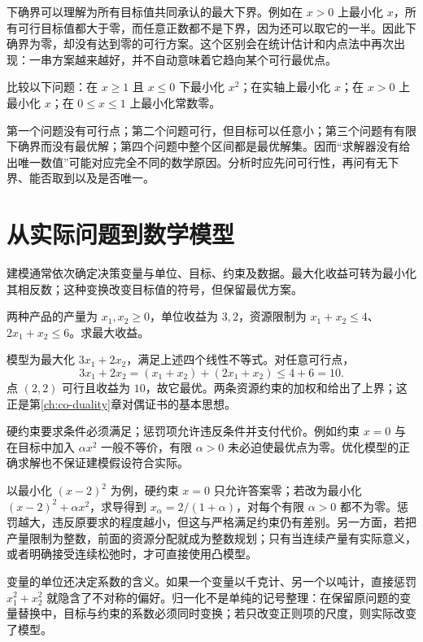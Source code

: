 下确界可以理解为所有目标值共同承认的最大下界。例如在 $x>0$ 上最小化 $x$，所有可行目标值都大于零，而任意正数都不是下界，因为还可以取它的一半。因此下确界为零，却没有达到零的可行方案。这个区别会在统计估计和内点法中再次出现：一串方案越来越好，并不自动意味着它趋向某个可行最优点。

\begin{example}[四种问题状态]
比较以下问题：在 $x\geq1$ 且 $x\leq0$ 下最小化 $x^2$；在实轴上最小化 $x$；在 $x>0$ 上最小化 $x$；在 $0\leq x\leq1$ 上最小化常数零。
\end{example}
\begin{solve}
第一个问题没有可行点；第二个问题可行，但目标可以任意小；第三个问题有有限下确界而没有最优解；第四个问题中整个区间都是最优解集。因而“求解器没有给出唯一数值”可能对应完全不同的数学原因。分析时应先问可行性，再问有无下界、能否取到以及是否唯一。
\end{solve}

\section{从实际问题到数学模型}

建模通常依次确定决策变量与单位、目标、约束及数据。最大化收益可转为最小化其相反数；这种变换改变目标值的符号，但保留最优方案。

\begin{example}[资源分配]
两种产品的产量为 $x_1,x_2\geq0$，单位收益为 $3,2$，资源限制为 $x_1+x_2\leq4$、$2x_1+x_2\leq6$。求最大收益。
\end{example}
\begin{solve}
模型为最大化 $3x_1+2x_2$，满足上述四个线性不等式。对任意可行点，
\[
 3x_1+2x_2=(x_1+x_2)+(2x_1+x_2)\leq4+6=10.
\]
点 $(2,2)$ 可行且收益为 $10$，故它最优。两条资源约束的加权和给出了上界；这正是第\ref{ch:co-duality}章对偶证书的基本思想。
\end{solve}

硬约束要求条件必须满足；惩罚项允许违反条件并支付代价。例如约束 $x=0$ 与在目标中加入 $\alpha x^2$ 一般不等价，有限 $\alpha>0$ 未必迫使最优点为零。优化模型的正确求解也不保证建模假设符合实际。

以最小化 $(x-2)^2$ 为例，硬约束 $x=0$ 只允许答案零；若改为最小化 $(x-2)^2+\alpha x^2$，求导得到 $x_\alpha=2/(1+\alpha)$，对每个有限 $\alpha>0$ 都不为零。惩罚越大，违反原要求的程度越小，但这与严格满足约束仍有差别。另一方面，若把产量限制为整数，前面的资源分配就成为整数规划；只有当连续产量有实际意义，或者明确接受连续松弛时，才可直接使用凸模型。

变量的单位还决定系数的含义。如果一个变量以千克计、另一个以吨计，直接惩罚 $x_1^2+x_2^2$ 就隐含了不对称的偏好。归一化不是单纯的记号整理：在保留原问题的变量替换中，目标与约束的系数必须同时变换；若只改变正则项的尺度，则实际改变了模型。

